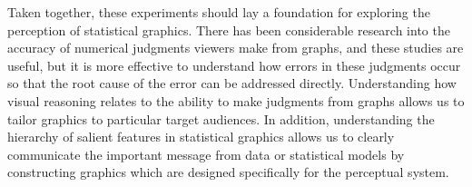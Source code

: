 \documentclass[11pt]{isuthesis}\usepackage[]{graphicx}\usepackage[]{color}
\begin{document}
Taken together, these experiments should lay a foundation for exploring the perception of statistical graphics. There has been considerable research into the accuracy of numerical judgments viewers make from graphs, and these studies are useful, but it is more effective to understand how errors in these judgments occur so that the root cause of the error can be addressed directly. Understanding how visual reasoning relates to the ability to make judgments from graphs allows us to tailor graphics to particular target audiences. In addition, understanding the hierarchy of salient features in statistical graphics allows us to clearly communicate the important message from data or statistical models by constructing graphics which are designed specifically for the perceptual system. 
% 
% 
\end{document}
